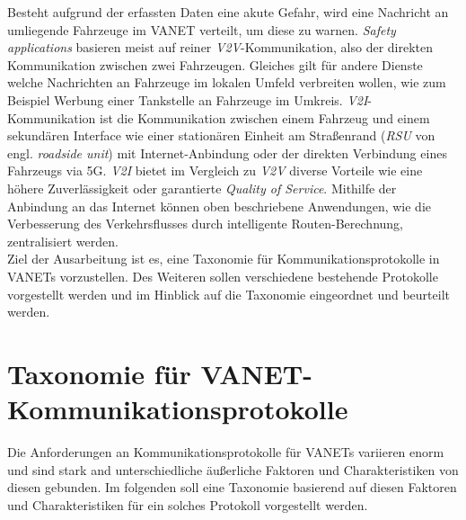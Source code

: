 \documentclass[english,runningheads,a4paper]{llncs}[2018/03/10]
\begin{document}
Besteht aufgrund der erfassten Daten eine akute Gefahr, wird eine Nachricht an umliegende Fahrzeuge im VANET verteilt, um diese zu warnen.
\textit{Safety applications} basieren meist auf reiner \textit{V2V}-Kommunikation, also der direkten Kommunikation zwischen zwei Fahrzeugen.
Gleiches gilt für andere Dienste welche Nachrichten an Fahrzeuge im lokalen Umfeld verbreiten wollen, wie zum Beispiel Werbung einer Tankstelle an Fahrzeuge im Umkreis.
\textit{V2I}-Kommunikation ist die Kommunikation zwischen einem Fahrzeug und einem sekundären Interface wie einer stationären Einheit am Straßenrand (\textit{RSU} von engl. \textit{roadside unit}) mit Internet-Anbindung oder der direkten Verbindung eines Fahrzeugs via 5G\@.
\textit{V2I} bietet im Vergleich zu \textit{V2V} diverse Vorteile wie eine höhere Zuverlässigkeit oder garantierte \textit{Quality of Service}.
Mithilfe der Anbindung an das Internet können oben beschriebene Anwendungen, wie die Verbesserung des Verkehrsflusses durch intelligente Routen-Berechnung, zentralisiert werden.\\
Ziel der Ausarbeitung ist es, eine Taxonomie für Kommunikationsprotokolle in VANETs vorzustellen.
Des Weiteren sollen verschiedene bestehende Protokolle vorgestellt werden und im Hinblick auf die Taxonomie eingeordnet und beurteilt werden.


\section{Taxonomie für VANET-Kommunikationsprotokolle}
\label{sec:taxcommunicationprotocol}
Die Anforderungen an Kommunikationsprotokolle für VANETs variieren enorm und sind stark and unterschiedliche äußerliche Faktoren und Charakteristiken von diesen gebunden.
Im folgenden soll eine Taxonomie basierend auf diesen Faktoren und Charakteristiken für ein solches Protokoll vorgestellt werden.
\end{document}
